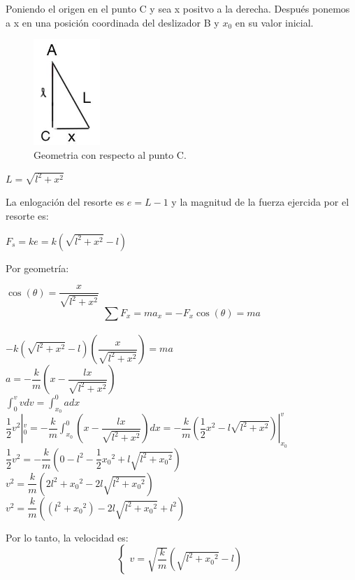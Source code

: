 \documentclass[a4paper,11pt]{scrartcl}
\begin{document}
\begin{center}

Poniendo el origen en el punto C y sea x positvo a la derecha. Después ponemos a x en una posición coordinada del deslizador B y $x_{0}$ en su valor inicial. \\

\begin{figure}[H]
  \centering
  \includegraphics[height=4cm]{14_2}
  \caption{Geometria con respecto al punto C.}
  \label{fig:14_2}
\end{figure}

\begin{center}
$L =  \sqrt{l^{2} + x^{2}}  $ \\
\end{center}
La enlogación del resorte es $ e = L -1 $ y la magnitud de la fuerza ejercida por el resorte es: \\
\begin{center}
$F_{s} = ke = k( \sqrt{l^{2} + x^{2}} - l )  $ \\
\end{center}
Por geometría:\\
\begin{center}
$\cos (\theta) = \dfrac{x}{\sqrt{l^{2} + x^{2}}}  $ \\
\[
\sum F_{x} = ma_{x} = -  F_{x} \cos (\theta)  = ma
\]
\\
$ -  k( \sqrt{l^{2} + x^{2}} - l ) (\dfrac{x}{\sqrt{l^{2} + x^{2}}}) = ma $\\ 
 $ a = - \dfrac{k}{m}(x - \dfrac{lx}{\sqrt{l^{2} + x^{2}}}) $\\
$ \int_{0}^{v} v dv = \int_{x_0}^{0} a dx $\\
$\dfrac{1}{2}v^{2} |_0^v =  - \dfrac{k}{m}  \int_{x_0}^{0} (x - \dfrac{lx}{\sqrt{l^{2} + x^{2}}}) dx =  - \dfrac{k}{m}(\dfrac{1}{2}x^{2} - l  \sqrt{l^{2} + x^{2}} ) |_{x_{0}}^v $\\
$ \dfrac{1}{2}v^{2} =   - \dfrac{k}{m}(0 -  l^{2} - \dfrac{1}{2}{x_{0}}^{2} + l  \sqrt{l^{2} +{x_{0}}^{2}} )  $\\
$ v^{2} = \dfrac{k}{m}(2 l^{2} + {x_{0}}^{2} - 2l  \sqrt{l^{2} +{x_{0}}^{2}} )  $\\
$ v^{2} = \dfrac{k}{m}(( l^{2} + {x_{0}}^{2})  - 2l  \sqrt{l^{2} +{x_{0}}^{2}} + l^{2}) $\\
\end{center}
Por lo tanto, la velocidad es: \\
\begin{equation}
  \left\lbrace
  \begin{array}{l}
    v = \sqrt{\dfrac{k}{m}}( \sqrt{l^{2} +{x_{0}}^{2}} - l )
  \end{array}
  \right.
\end{equation}

\end{center}
\end{document}
